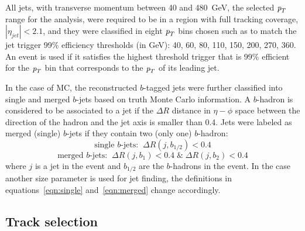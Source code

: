 All jets, with transverse momentum between 40 and 480~GeV,  the selected ${\emph{p}_{T}}$ range for the analysis, were required to be in a region with full tracking coverage, $|\eta_{jet}|<2.1$, and they were classified in eight ${\emph{p}_{T}}$ bins chosen such as to match the jet trigger 99\% efficiency thresholds (in GeV): 40, 60, 80, 110, 150, 200, 270, 360. An event is used if it satisfies the highest threshold trigger that is 99\% efficient for the ${\emph{p}_{T}}$ bin that corresponds to the ${\emph{p}_{T}}$ of its leading jet.

In the case of MC, the reconstructed $b$-tagged jets were further classified into single and merged $b$-jets based on truth Monte Carlo information. A $b$-hadron is considered to be associated to a jet if the $\Delta R$ distance in $\eta-\phi$ space between the direction of the hadron and the jet axis is smaller than 0.4. Jets were labeled as merged (single) $b$-jets if they contain two (only one) $b$-hadron:%
\begin{equation}
\mbox{single $b$-jets:} \; \; \Delta R(j,b_{1/2}) < 0.4
\label{eqn:single}
\end{equation}
\begin{equation}
\mbox{merged $b$-jets:}  \; \; \Delta R(j,b_1) < 0.4 \; \& \;  \Delta R(j,b_2) < 0.4
\label{eqn:merged}
\end{equation}
%
where $j$ is a jet in the event and $b_{1/2}$ are the $b$-hadrons in the event. In the case another size parameter is used for jet finding, the definitions in equations~\ref{eqn:single} and~\ref{eqn:merged} change accordingly.


\subsection{Track selection}\label{sec:trackselection}

